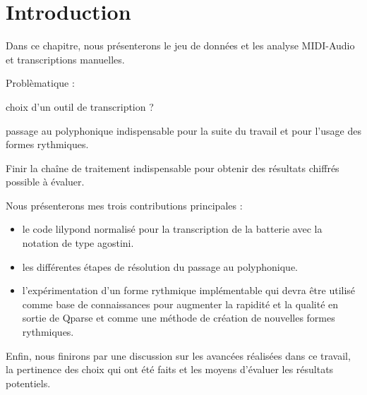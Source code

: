 \section*{Introduction}
Dans ce chapitre, nous présenterons le jeu de données et les analyse MIDI-Audio
et transcriptions manuelles.

Problèmatique :

choix d’un outil de transcription ?

passage au polyphonique indispensable pour la suite du travail
et pour l’usage des formes rythmiques.

Finir la chaîne de traitement indispensable pour obtenir des résultats chiffrés
possible à évaluer.

Nous présenterons mes trois contributions principales :
\begin{itemize}
    \item le code lilypond normalisé pour la transcription de la batterie avec
        la notation de type agostini.
    \item les différentes étapes de résolution du passage au polyphonique.
    \item l’expérimentation d’un forme rythmique implémentable qui devra être
        utilisé comme base de connaissances pour augmenter la rapidité et la
        qualité en sortie de Qparse et comme une méthode de création de
        nouvelles formes rythmiques.
\end{itemize}

Enfin, nous finirons par une discussion sur les avancées réalisées dans ce
travail, la pertinence des choix qui ont été faits et les moyens d’évaluer les
résultats potentiels.

